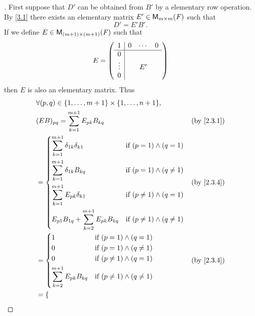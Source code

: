 \begin{proof}[]
	First suppose that \(D'\) can be obtained from \(B'\) by a elementary row operation.
	By \cref{3.1} there exists an elementary matrix \(E' \in \mathsf{M}_{{m} \times m}({\mathit{F}})\) such that
	\[
		D' = E' B'.
	\]
	If we define \(E \in \mathsf{M}_{{(m + 1)} \times (m + 1)}({\mathit{F}})\) such that
	\[
		E = \left\lparen\begin{array}{c|ccc}
				1      & 0 & \cdots & 0 \\
				\hline
				0      &   &        &   \\
				\vdots &   & E'     &   \\
				0      &   &        &
			\end{array}\right\rparen
	\]
	then \(E\) is also an elementary matrix.
	Thus
	\begin{align*}
		 & \forall (p, q) \in \set{1, \dots, m + 1} \times \set{1, \dots, n + 1},                                             \\
		 & (E B)_{p q} = \sum_{k = 1}^{m + 1} E_{p k} B_{k q}                                                 &  & \by{2.3.1} \\
		 & = \begin{dcases}
			     \sum_{k = 1}^{m + 1} \delta_{1 k} \delta_{k 1}         & \text{if } (p = 1) \land (q = 1)       \\
			     \sum_{k = 1}^{m + 1} \delta_{1 k} B_{k q}              & \text{if } (p = 1) \land (q \neq 1)    \\
			     \sum_{k = 1}^{m + 1} E_{p k} \delta_{k 1}              & \text{if } (p \neq 1) \land (q = 1)    \\
			     E_{p 1} B_{1 q} + \sum_{k = 2}^{m + 1} E_{p k} B_{k q} & \text{if } (p \neq 1) \land (q \neq 1)
		     \end{dcases} &  & \by{2.3.4}                  \\
		 & = \begin{dcases}
			     1                                    & \text{if } (p = 1) \land (q = 1)       \\
			     0                                    & \text{if } (p = 1) \land (q \neq 1)    \\
			     0                                    & \text{if } (p \neq 1) \land (q = 1)    \\
			     \sum_{k = 2}^{m + 1} E_{p k} B_{k q} & \text{if } (p \neq 1) \land (q \neq 1)
		     \end{dcases}                   &  & \by{2.3.4}                                    \\
		 & = \begin{dcases}

\end{dcases}
\end{align*}
\end{proof}
